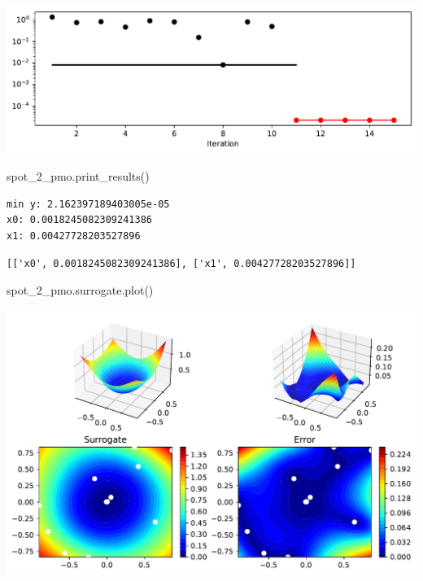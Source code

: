 \documentclass[
  letterpaper,
  DIV=11,
  numbers=noendperiod]{scrreprt}
\newenvironment{Shaded}{\begin{snugshade}}{\end{snugshade}}
\newcommand{\NormalTok}[1]{\textcolor[rgb]{0.00,0.23,0.31}{#1}}
\begin{document}
\includegraphics{015_num_spot_correlation_p_files/figure-pdf/cell-21-output-1.pdf}

\begin{Shaded}
\begin{Highlighting}[]
\NormalTok{spot\_2\_pmo.print\_results()}
\end{Highlighting}
\end{Shaded}

\begin{verbatim}
min y: 2.162397189403005e-05
x0: 0.0018245082309241386
x1: 0.00427728203527896
\end{verbatim}

\begin{verbatim}
[['x0', 0.0018245082309241386], ['x1', 0.00427728203527896]]
\end{verbatim}

\begin{Shaded}
\begin{Highlighting}[]
\NormalTok{spot\_2\_pmo.surrogate.plot()}
\end{Highlighting}
\end{Shaded}

\includegraphics{015_num_spot_correlation_p_files/figure-pdf/cell-23-output-1.pdf}
\end{document}
